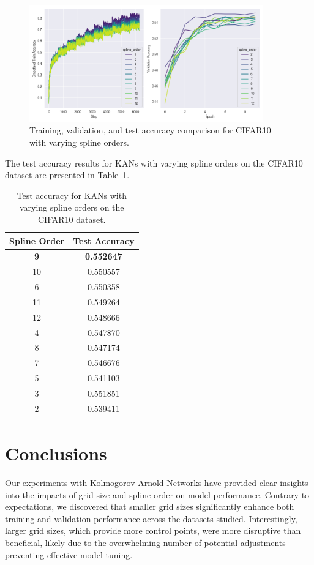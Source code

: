 \documentclass{article}
\begin{document}
\begin{figure}[H]
    \centering
    \includegraphics[width=0.9\textwidth]{pics/cifar10_accuracy_spline_order}
    \caption{Training, validation, and test accuracy comparison for CIFAR10 with varying spline orders.}
    \label{fig:cifar10_accuracy_spline_order}
\end{figure}


The test accuracy results for KANs with varying spline orders on the CIFAR10 dataset are presented in Table~\ref{tab:test_accuracy_spline_order_cifar10}.

\begin{table}[H]
    \centering
    \caption{Test accuracy for KANs with varying spline orders on the CIFAR10 dataset.}
    \label{tab:test_accuracy_spline_order_cifar10}
    \begin{tabular}{|c|c|}
        \hline
        Spline Order & Test Accuracy \\
        \hline
        \textbf{9}  & \textbf{0.552647} \\
        10 & 0.550557 \\
        6  & 0.550358 \\
        11 & 0.549264 \\
        12 & 0.548666 \\
        4  & 0.547870 \\
        8  & 0.547174 \\
        7  & 0.546676 \\
        5  & 0.541103 \\
        3  & 0.551851 \\
        2  & 0.539411 \\
        \hline
    \end{tabular}
\end{table}


\section{Conclusions}\label{sec:conclusions}
Our experiments with Kolmogorov-Arnold Networks have provided clear insights into the impacts of grid size and spline order on model performance.
Contrary to expectations, we discovered that smaller grid sizes significantly enhance both training and validation performance across the datasets studied.
Interestingly, larger grid sizes, which provide more control points, were more disruptive than beneficial,
likely due to the overwhelming number of potential adjustments preventing effective model tuning.
\end{document}
